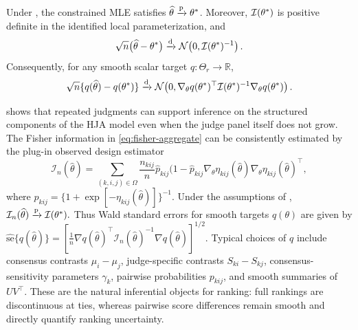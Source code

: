 \documentclass{article}
\begin{document}
\begin{bibunit}[unsrtnat]
\begin{theorem}
\label{thm:asymptotics}
    Under
    ,
    the constrained MLE satisfies
    \(\widehat{\theta}\xrightarrow{\textup{p}}\theta^*\). Moreover,
    \(\mathcal{I}(\theta^*)\) is positive definite in the identified
    local parameterization, and
    \[
        \sqrt{n}\big(\widehat{\theta}-\theta^*\big)
        \xrightarrow{\textup{d}}
        \mathcal{N}\!\left(
            0,
            \mathcal{I}(\theta^*)^{-1}
        \right).
    \]
    Consequently, for any smooth scalar target \(q:\Theta_r\to\mathbb{R}\),
    \[
        \sqrt{n}\{q(\widehat{\theta})-q(\theta^*)\}
        \xrightarrow{\textup{d}}
        \mathcal{N}\!\left(
            0,
            \nabla_{\theta}q(\theta^*)^\top
            \mathcal{I}(\theta^*)^{-1}
            \nabla_{\theta}q(\theta^*)
        \right).
    \]
\end{theorem}


 shows that repeated judgments can support inference on the structured components of the HJA model even when the judge panel itself does not grow.
The Fisher information in \eqref{eq:fisher-aggregate} can be consistently estimated by the plug-in observed design estimator
\begin{equation}
\label{eq:fisher-plugin}
    \mathcal{I}_{n}(\widehat{\theta})
    =
    \sum_{(k,i,j)\in\Omega}
    \frac{n_{kij}}{n}
    \widehat p_{kij}(1-\widehat p_{kij}
    \nabla_{\theta}\eta_{kij}(\widehat{\theta})
    \nabla_{\theta}\eta_{kij}(\widehat{\theta})^\top ,
\end{equation}
where
\(
    \widehat p_{kij}
    =
    \{1+\exp[-\eta_{kij}(\widehat{\theta})]\}^{-1}.
\)
Under the assumptions of ,
\(
    \mathcal{I}_{n}(\widehat{\theta})
    \xrightarrow{\textup{p}}
    \mathcal{I}(\theta^*).
\)
Thus Wald standard errors for smooth targets \(q(\theta)\) are given by
\(
    \widehat{\mathrm{se}}\{q(\widehat{\theta})\}
    =
    [
    \frac{1}{n}
    \nabla q(\widehat{\theta})^\top
    \mathcal{I}_n(\widehat{\theta})^{-1}
    \nabla q(\widehat{\theta})
    ]^{1/2}.
\)
Typical choices of \(q\) include consensus contrasts \(\mu_i-\mu_j\), judge-specific contrasts \(S_{ki}-S_{kj}\), consensus-sensitivity parameters \(\gamma_k\), pairwise probabilities \(p_{kij}\), and smooth summaries of \(UV^\top\).
These are the natural inferential objects for ranking: full rankings are discontinuous at ties, whereas pairwise score differences remain smooth and directly quantify ranking uncertainty.





\end{bibunit}
\end{document}
